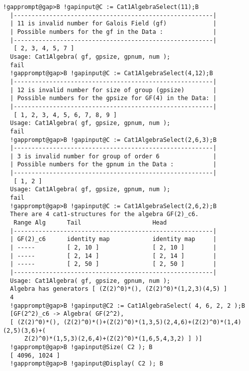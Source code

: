\documentclass[a4paper,11pt]{report}
\begin{document}
{{\begin{Verbatim}[commandchars=!@B,fontsize=\small,frame=single,label=Example]
  !gapprompt@gap>B !gapinput@C := Cat1AlgebraSelect(11);B
  |--------------------------------------------------------|
  | 11 is invalid number for Galois Field (gf)             |
  | Possible numbers for the gf in the Data :              |
  |--------------------------------------------------------|
   [ 2, 3, 4, 5, 7 ]
  Usage: Cat1Algebra( gf, gpsize, gpnum, num );
  fail
  !gapprompt@gap>B !gapinput@C := Cat1AlgebraSelect(4,12);B
  |--------------------------------------------------------|
  | 12 is invalid number for size of group (gpsize)        |
  | Possible numbers for the gpsize for GF(4) in the Data: |
  |--------------------------------------------------------|
   [ 1, 2, 3, 4, 5, 6, 7, 8, 9 ]
  Usage: Cat1Algebra( gf, gpsize, gpnum, num );
  fail
  !gapprompt@gap>B !gapinput@C := Cat1AlgebraSelect(2,6,3);B
  |--------------------------------------------------------|
  | 3 is invalid number for group of order 6               |
  | Possible numbers for the gpnum in the Data :           |
  |--------------------------------------------------------|
   [ 1, 2 ]
  Usage: Cat1Algebra( gf, gpsize, gpnum, num );
  fail
  !gapprompt@gap>B !gapinput@C := Cat1AlgebraSelect(2,6,2);B
  There are 4 cat1-structures for the algebra GF(2)_c6.
   Range Alg      Tail                    Head
  |--------------------------------------------------------|
  | GF(2)_c6      identity map            identity map     |
  | -----         [ 2, 10 ]               [ 2, 10 ]        |
  | -----         [ 2, 14 ]               [ 2, 14 ]        |
  | -----         [ 2, 50 ]               [ 2, 50 ]        |
  |--------------------------------------------------------|
  Usage: Cat1Algebra( gf, gpsize, gpnum, num );
  Algebra has generators [ (Z(2)^0)*(), (Z(2)^0)*(1,2,3)(4,5) ]
  4
  !gapprompt@gap>B !gapinput@C2 := Cat1AlgebraSelect( 4, 6, 2, 2 );B
  [GF(2^2)_c6 -> Algebra( GF(2^2),
  [ (Z(2)^0)*(), (Z(2)^0)*()+(Z(2)^0)*(1,3,5)(2,4,6)+(Z(2)^0)*(1,4)(2,5)(3,6)+(
      Z(2)^0)*(1,5,3)(2,6,4)+(Z(2)^0)*(1,6,5,4,3,2) ] )]
  !gapprompt@gap>B !gapinput@Size( C2 ); B
  [ 4096, 1024 ]
  !gapprompt@gap>B !gapinput@Display( C2 ); B
  

\end{Verbatim}}}
\end{document}
